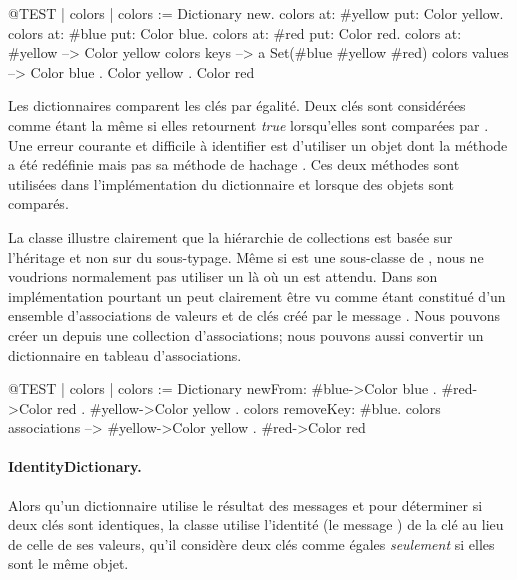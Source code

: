 \documentclass[a4paper,10pt,twoside]{book}
\begin{document}
\begin{code}{@TEST | colors |}
colors := Dictionary new.
colors at: #yellow put: Color yellow.
colors at: #blue put: Color blue.
colors at: #red put: Color red.
colors at: #yellow --> Color yellow
colors keys          --> a Set(#blue #yellow #red)
colors values       --> {Color blue . Color yellow . Color red}
\end{code}

Les dictionnaires comparent les clés par égalité. Deux clés sont
considérées comme étant la même si elles retournent \emph{true}
lorsqu'elles sont comparées par \ct{=}. Une erreur courante et difficile à
identifier est d'utiliser un objet dont la méthode \ct{=} a été
redéfinie mais pas sa méthode de hachage . Ces deux
méthodes sont utilisées dans l'implémentation du dictionnaire
et lorsque des objets sont comparés.

La classe  illustre clairement que la hiérarchie
de collections est basée sur l'héritage et non sur du sous-typage.
Même si  est une sous-classe de , nous
ne voudrions normalement pas utiliser un  là où
un  est attendu. 
Dans son implémentation pourtant un  peut
clairement être vu comme étant constitué d'un ensemble d'associations
de valeurs et de clés créé par le message . Nous
pouvons créer un  depuis une collection d'associations; nous
pouvons aussi convertir un dictionnaire en tableau d'associations.

\begin{code}{@TEST | colors |}
colors := Dictionary newFrom: { #blue->Color blue . #red->Color red . #yellow->Color yellow }.
colors removeKey: #blue.
colors associations --> {#yellow->Color yellow . #red->Color red}
\end{code}

\paragraph{IdentityDictionary.}
Alors qu'un dictionnaire utilise le résultat des messages \ct{=} et  pour déterminer si deux clés sont identiques, la classe  utilise l'identité (\cad le message ) de la clé au lieu de celle de ses valeurs, \ie qu'il considère deux clés comme égales \emph{seulement} si elles sont le même objet.
\end{document}
